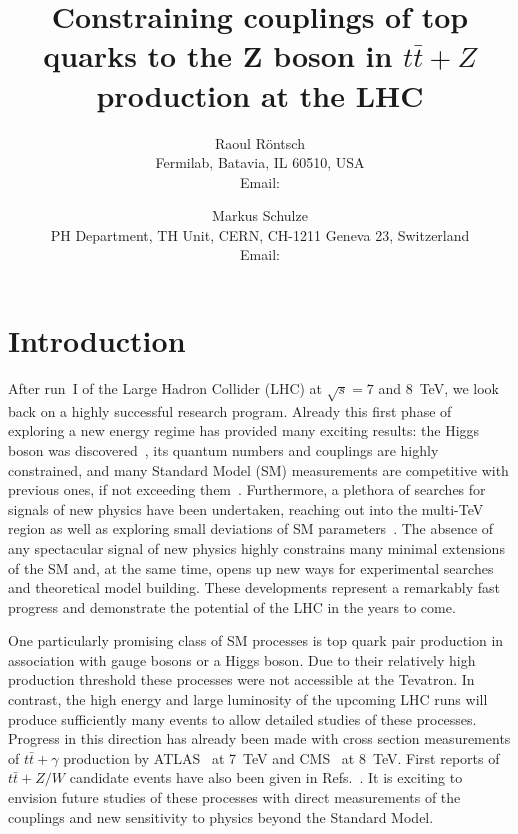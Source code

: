 \documentclass[preprint]{JHEP3} %
\title{Constraining couplings of top quarks to the Z boson in $t\bar{t}+Z$ production at the LHC}
\author{Raoul R\"ontsch \\ Fermilab, Batavia, IL 60510, USA \\
  Email: \email{rontsch@fnal.gov} }
\author{Markus Schulze \\ PH Department, TH Unit, CERN, CH-1211 Geneva 23, Switzerland \\
  Email: \email{markus.schulze@cern.ch} }
\def\ttb{t\bar{t}}
\begin{document}

\section{Introduction}
After run~I of the Large Hadron Collider (LHC) at $\sqrt{s}=7$ and 8~TeV, we look back on a highly successful research program.
Already this first phase of exploring a new energy regime has provided many exciting results: 
the Higgs boson was discovered~\cite{Chatrchyan:2012ufa,Aad:2012tfa}, its quantum numbers and couplings are highly constrained,
and many Standard Model (SM) measurements are competitive with previous ones, if not exceeding them~\cite{}.
Furthermore, a plethora of searches for signals of new physics have been undertaken, reaching out into the multi-TeV region as well as
exploring small deviations of SM parameters~\cite{}. 
The absence of any spectacular signal of new physics highly constrains many minimal extensions of the SM and, at the same time, 
opens up new ways for %
experimental searches and theoretical model building.
These developments represent a remarkably fast progress and demonstrate the potential of the LHC in the years to come.

One particularly promising class of SM processes is top quark pair production in association with gauge bosons or a Higgs boson.
Due to their relatively high production threshold these processes were not accessible at the Tevatron. 
In contrast, the high energy and large luminosity of the upcoming LHC runs will produce sufficiently many events to allow detailed studies of these processes.
Progress in this direction has already been made with cross section measurements of $\ttb+\gamma$ production by ATLAS~\cite{ATLAS-CONF-2011-153} at 7~TeV  
and CMS~\cite{CMS-PAS-TOP-13-011} at 8~TeV. First reports of $\ttb+Z/W$ candidate events have also been given in Refs.~\cite{ATLAS-CONF-2012-126,Chatrchyan:2013qca}.
It is exciting to envision future studies of these processes with direct measurements of the couplings and new sensitivity to physics beyond the Standard Model. 
\end{document}
